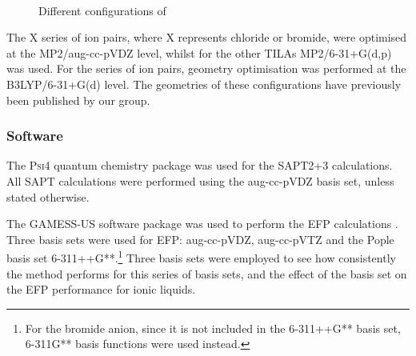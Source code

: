 \begin{figure}
    \centering
    \mbox{
    }
    \mbox{
    }                                 
    \mbox{                            
    }
    \caption{Different configurations of \protect{} \label{fig:conf-c2mpyr-ntf2}}
\end{figure}


The X series of ion pairs, where X represents chloride or bromide, were optimised at the MP2/aug-cc-pVDZ level, whilst for the other TILAs MP2/6-31+G(d,p) was used.
For the  series of ion pairs, geometry optimisation was performed at the B3LYP/6-31+G(d) level.
The geometries of these configurations have previously been published by our group.
\cite{Izgorodina2014a, Rigby2014a}


\subsubsection{Software}

The \textsc{Psi4} quantum chemistry package was used for the SAPT2+3 calculations. 
\cite{Turney2012a}
All SAPT calculations were performed using the aug-cc-pVDZ basis set, unless stated otherwise.
\cite{Izgorodina2014a}


The GAMESS-US software package was used to perform the EFP calculations
\cite{Schmidt1993a, Gordon2005a}.
Three basis sets were used for EFP: aug-cc-pVDZ, aug-cc-pVTZ and the Pople basis set 6-311++G**.\footnote{For the bromide anion, since it is not included in the 6-311++G** basis set, 6-311G** basis functions were used instead.}
Three basis sets were employed to see how consistently the method performs for this series of basis sets, and the effect of the basis set on the EFP performance for ionic liquids.

